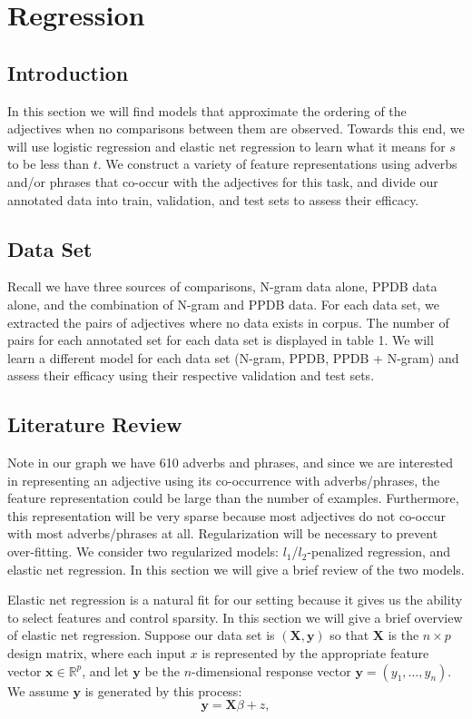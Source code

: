 \section{Regression}

\subsection{Introduction}

In this section we will find models that approximate the ordering of the adjectives when no comparisons between them are observed.  Towards this end, we will use logistic regression and elastic net regression to learn what it means for $s$ to be less than $t$. We construct a variety of feature representations using adverbs and/or phrases that co-occur with the adjectives for this task, and divide our annotated data into train, validation, and test sets to assess their efficacy. 

\subsection{Data Set}

Recall we have three sources of comparisons, N-gram data alone, PPDB data alone, and the combination of N-gram and PPDB data. For each data set, we extracted the pairs of adjectives where no data exists in corpus. The number of pairs for each annotated set for each data set is displayed in table 1. We will learn a different model for each data set (N-gram, PPDB, PPDB + N-gram) and assess their efficacy using their respective validation and test sets. 

\subsection{Literature Review}

Note in our graph we have 610 adverbs and phrases, and since we are interested in representing an adjective using its co-occurrence with adverbs/phrases, the feature representation could be large than the number of examples. Furthermore, this representation will be very sparse because most adjectives do not co-occur with most adverbs/phrases at all. Regularization will be necessary to prevent over-fitting. We consider two regularized models: $l_1$/$l_2$-penalized regression, and elastic net regression. In this section we will give a brief review of the two models.

Elastic net regression is a natural fit for our setting because it gives us the ability to select features and control sparsity. In this section we will give a brief overview of elastic net regression. Suppose our data set is $(\pmb{X}, \pmb{y})$ so that $\pmb{X}$ is the $n \times p$ design matrix, where each input $x$ is represented by the appropriate feature vector $\pmb{x} \in \mathbb{R}^p$, and let $\pmb{y}$ be the $n$-dimensional response vector $\pmb{y} = (y_1, \ldots, y_n)$. We assume $\pmb{y}$ is generated by this process:
	\[
		\pmb{y} = \pmb{X} \mathcal{\beta} + z,
	\]

